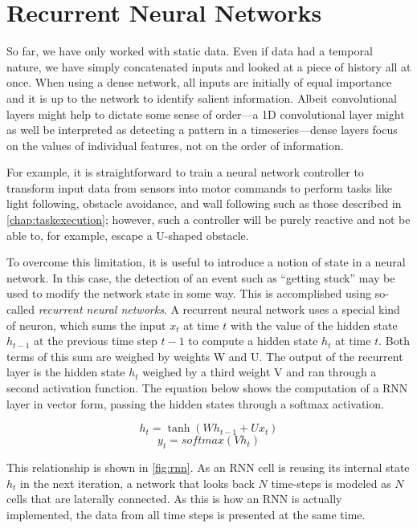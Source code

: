 \section{Recurrent Neural Networks}

So far, we have only worked with static data. Even if data had a temporal nature, we have simply concatenated inputs and looked at a piece of history all at once. When using a dense network, all inputs are initially of equal importance and it is up to the network to identify salient information. Albeit convolutional layers might help to dictate some sense of order---a 1D convolutional layer might as well be interpreted as detecting a pattern in a timeseries---dense layers focus on the values of individual features, not on the order of information.

For example, it is straightforward to train a neural network controller to transform input data from sensors into motor commands to perform tasks like light following, obstacle avoidance, and wall following such as those described in \cref{chap:taskexecution}; however, such a controller will be purely reactive and not be able to, for example, escape a U-shaped obstacle.

To overcome this limitation, it is useful to introduce a notion of state in a neural network. In this case, the detection of an event such as ``getting stuck'' may be used to modify the network state in some way. This is accomplished using so-called \textsl{recurrent neural networks}.
A recurrent neural network uses a special kind of neuron, which sums the input $x_t$ at time $t$ with the value of the hidden state $h_{t-1}$ at the previous time step $t-1$ to compute a hidden state $h_t$ at time $t$. Both terms of this sum are weighed by weights W and U. The output of the recurrent layer is the hidden state $h_t$ weighed by a third weight V and ran through a second activation function. The equation below shows the computation of a RNN layer in vector form, passing the hidden states through a softmax activation.

\begin{equation}
h_t = \tanh(Wh_{t-1}+Ux_t)
\end{equation}
\begin{equation}
y_t = softmax(Vh_t)
\end{equation}

This relationship is shown in \cref{fig:rnn}. As an RNN cell is reusing its internal state $h_t$ in the next iteration, a network that looks back $N$ time-steps is modeled as $N$ cells that are laterally connected. As this is how an RNN is actually implemented, the data from all time steps is presented at the same time.

